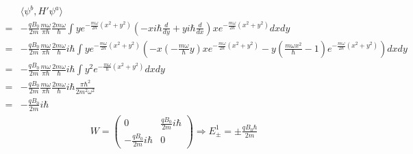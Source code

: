 \begin{enumerate}
\begin{align*}
    \end{align*}
    \begin{align*}
        &\langle\psi^b, H'\psi^a\rangle\\
        =&
        -\frac{qB_0}{2m}\frac{m\omega}{\pi\hbar}\frac{2m\omega}{\hbar}\int 
        ye^{-\frac{m\omega}{2\hbar}(x^2+y^2)}
        (-xi\hbar\frac{d}{dy}+yi\hbar\frac{d}{dx})
        xe^{-\frac{m\omega}{2\hbar}(x^2+y^2)}dxdy\\
        =&
        -\frac{qB_0}{2m}
        \frac{m\omega}{\pi\hbar}\frac{2m\omega}{\hbar}
        i\hbar 
        \int y
        e^{-\frac{m\omega}{2\hbar}(x^2+y^2)}
        (-x(-\frac{m\omega}{\hbar}y)xe^{-\frac{m\omega}{2\hbar}(x^2+y^2)}
        -y(\frac{m\omega x^2}{\hbar}-1)e^{-\frac{m\omega}{2\hbar}(x^2+y^2)})dxdy\\
        =&
        -\frac{qB_0}{2m}
        \frac{m\omega}{\pi\hbar}\frac{2m\omega}{\hbar}
        i\hbar 
        \int y^2e^{-\frac{m\omega}{\hbar}(x^2+y^2)}dxdy\\
        =&-\frac{qB_0}{2m}\frac{m\omega}{\pi\hbar}\frac{2m\omega}{\hbar}
        i\hbar \frac{\pi\hbar^2}{2m^2\omega^2}\\
        =& 
        -\frac{qB_0}{2m}
        i\hbar
    \end{align*}
    \begin{align*}
        W = \begin{pmatrix}
            0 & \frac{qB_0}{2m}i\hbar\\
            -\frac{qB_0}{2m}i\hbar  & 0
        \end{pmatrix}\Rightarrow 
        E^1_{\pm}=\pm\frac{qB_0\hbar}{2m}
    \end{align*}
    
\end{enumerate}

